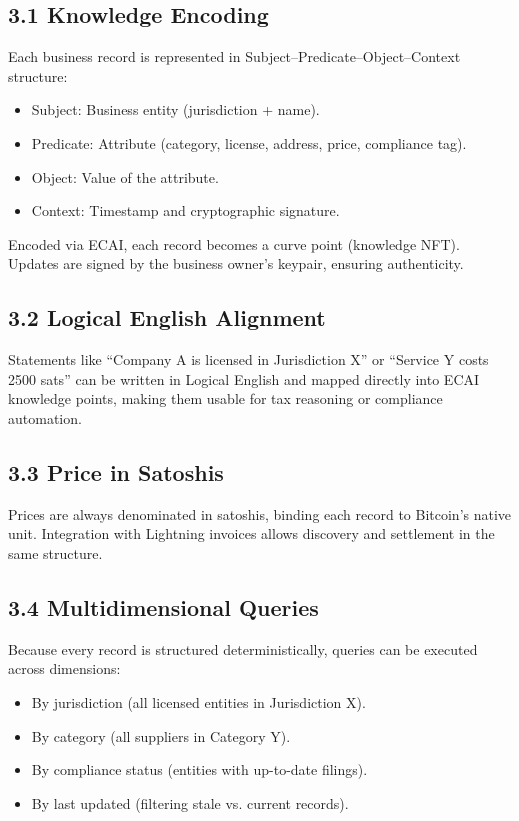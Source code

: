 \documentclass[11pt]{article}
\begin{document}
\subsection*{3.1 Knowledge Encoding}
Each business record is represented in Subject–Predicate–Object–Context structure:
\begin{itemize}
  \item Subject: Business entity (jurisdiction + name).
  \item Predicate: Attribute (category, license, address, price, compliance tag).
  \item Object: Value of the attribute.
  \item Context: Timestamp and cryptographic signature.
\end{itemize}

Encoded via ECAI, each record becomes a curve point (knowledge NFT). Updates are signed by the business owner’s keypair, ensuring authenticity.

\subsection*{3.2 Logical English Alignment}
Statements like ``Company A is licensed in Jurisdiction X'' or ``Service Y costs 2500 sats'' can be written in Logical English and mapped directly into ECAI knowledge points, making them usable for tax reasoning or compliance automation.

\subsection*{3.3 Price in Satoshis}
Prices are always denominated in satoshis, binding each record to Bitcoin’s native unit. Integration with Lightning invoices allows discovery and settlement in the same structure.

\subsection*{3.4 Multidimensional Queries}
Because every record is structured deterministically, queries can be executed across dimensions:
\begin{itemize}
  \item By jurisdiction (all licensed entities in Jurisdiction X).
  \item By category (all suppliers in Category Y).
  \item By compliance status (entities with up-to-date filings).
  \item By last updated (filtering stale vs. current records).
\end{itemize}
\end{document}
